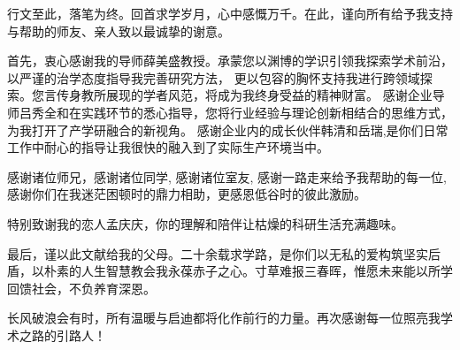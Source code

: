 
\begin{acknowledgements}

    行文至此，落笔为终。回首求学岁月，心中感慨万千。在此，谨向所有给予我支持与帮助的师友、亲人致以最诚挚的谢意。

    首先，衷心感谢我的导师薛美盛教授。承蒙您以渊博的学识引领我探索学术前沿，以严谨的治学态度指导我完善研究方法，
    更以包容的胸怀支持我进行跨领域探索。您言传身教所展现的学者风范，将成为我终身受益的精神财富。
    感谢企业导师吕秀全和在实践环节的悉心指导，您将行业经验与理论创新相结合的思维方式，为我打开了产学研融合的新视角。
    感谢企业内的成长伙伴韩清和岳瑞,是你们日常工作中耐心的指导让我很快的融入到了实际生产环境当中。

    感谢诸位师兄，感谢诸位同学, 感谢诸位室友, 感谢一路走来给予我帮助的每一位, 感谢你们在我迷茫困顿时的鼎力相助，更感恩低谷时的彼此激励。
    
    特别致谢我的恋人孟庆庆，你的理解和陪伴让枯燥的科研生活充满趣味。
    
    最后，谨以此文献给我的父母。二十余载求学路，是你们以无私的爱构筑坚实后盾，以朴素的人生智慧教会我永葆赤子之心。寸草难报三春晖，惟愿未来能以所学回馈社会，不负养育深恩。
    
    长风破浪会有时，所有温暖与启迪都将化作前行的力量。再次感谢每一位照亮我学术之路的引路人！

\end{acknowledgements}
